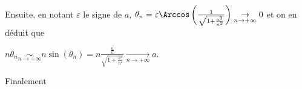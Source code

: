 {{Ensuite, en notant $\varepsilon$ le signe de $a$, $\theta_n=\varepsilon\Arccos\left(\frac{1}{\sqrt{1+\frac{a^2}{n^2}}}\right)\underset{n\rightarrow+\infty}{\rightarrow}0$ et on en déduit que

\begin{center}
$n\theta_n \underset{n\rightarrow+\infty}{\sim}n\sin(\theta_n)=n\frac{\frac{a}{n}}{\sqrt{1+\frac{a^2}{n^2}}}\underset{n\rightarrow+\infty}{\rightarrow}a$.
\end{center}

Finalement

\begin{center}
\end{center}
}
}
